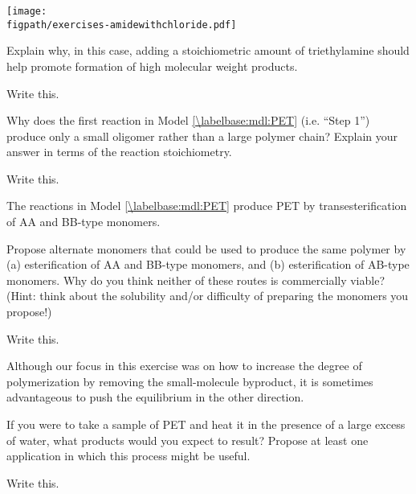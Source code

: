 \begin{activity}
\begin{exercises}
		\centerline{\texttt{[image: \\figpath/exercises-amidewithchloride.pdf]}}
		
		Explain why, in this case, adding a stoichiometric amount of triethylamine should help promote formation of high molecular weight products.
		
			\begin{solution}
				Write this.
			\end{solution}
		
		\exercise Why does the first reaction in Model \ref{\labelbase:mdl:PET} (i.e. ``Step 1'') produce only a small oligomer rather than a large polymer chain?  Explain your answer in terms of the reaction stoichiometry.
		
			\begin{solution}
				Write this.
			\end{solution}
		
	
		\exercise The reactions in Model \ref{\labelbase:mdl:PET} produce PET by transesterification of AA and BB-type monomers.
		
			Propose alternate monomers that could be used to produce the same polymer by (a) esterification of AA and BB-type monomers, and (b) esterification of AB-type monomers.  Why do you think neither of these routes is commercially viable?  (Hint: think about the solubility and/or difficulty of preparing the monomers you propose!)
		
			\begin{solution}
				Write this.
			\end{solution}
		
		\exercise Although our focus in this exercise was on how to increase the degree of polymerization by removing the small-molecule byproduct, it is sometimes advantageous to push the equilibrium in the other direction.
		
			If you were to take a sample of PET and heat it in the presence of a large excess of water, what products would you expect to result?  Propose at least one application in which this process might be useful.
		
			\begin{solution}
				Write this.
			\end{solution}
			
			
		
\end{exercises}
	
\end{activity}